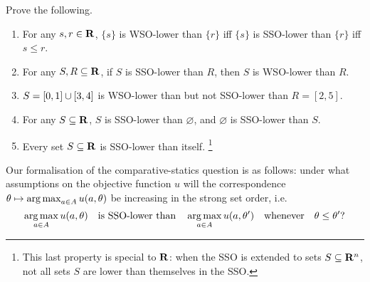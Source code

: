 \begin{exercise}
	\label{exercise:sso_wso}
	Prove the following.
	\begin{enumerate}[label=(\alph*)]

		\item For any $s,r \in \mathbf{R}$, $\{s\}$ is WSO-lower than $\{r\}$ iff $\{s\}$ is SSO-lower than $\{r\}$ iff $s \leq r$.
	
		\item \label{item:wso_sso_impl} For any $S,R \subseteq \mathbf{R}$, if $S$ is SSO-lower than $R$, then $S$ is WSO-lower than $R$.

		\item \label{item:sso_wso_nonequiv} $S = [0,1] \cup [3,4]$ is WSO-lower than but not SSO-lower than $R = [2,5]$.

		\item \label{item:sso_wso:empty} For any $S \subseteq \mathbf{R}$, $S$ is SSO-lower than $\varnothing$, and $\varnothing$ is SSO-lower than $S$.

		\item Every set $S \subseteq \mathbf{R}$ is SSO-lower than itself.%
			\footnote{This last property is special to $\mathbf{R}$: when the SSO is extended to sets $S \subseteq \mathbf{R}^n$, not all sets $S$ are lower than themselves in the SSO.}
	
	\end{enumerate}
\end{exercise}

Our formalisation of the comparative-statics question is as follows: under what assumptions on the objective function $u$ will the correspondence $\theta \mapsto \operatorname*{arg\,max}_{a \in A} u(a,\theta)$ be increasing in the strong set order, i.e.
%
\begin{equation*}
	\operatorname*{arg\,max}_{a \in A} u(a,\theta)
	\quad \text{is SSO-lower than} \quad
	\operatorname*{arg\,max}_{a \in A} u(a,\theta')
	\quad \text{whenever} \quad
	\theta \leq \theta' ?
\end{equation*}


